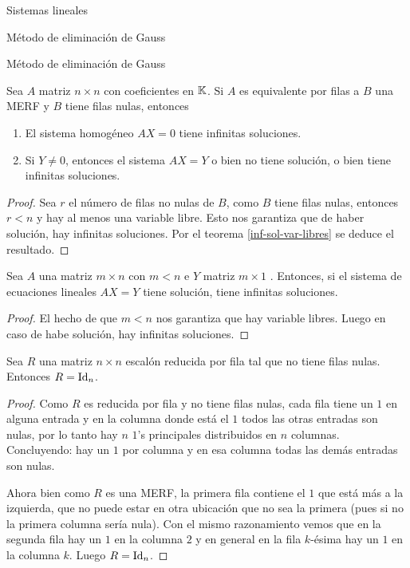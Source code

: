 \begin{chapter}{Sistemas lineales}
\begin{section}{Método de eliminación de Gauss }
\begin{subsection}{Método de eliminación de Gauss}
    \begin{corolario}\label{inf-sol}
        Sea $A$ matriz $n \times n$ con coeficientes en $\mathbb K$. Si $A$ es equivalente por filas a  $B$ una  MERF y $B$ tiene filas nulas, entonces
        \begin{enumerate}
            \item\label{sol-homogeneo-2} El sistema homogéneo $AX=0$ tiene  infinitas soluciones. 
            \item\label{sol-no-homogeneo-2} Si $Y \ne 0$,  entonces el sistema  $AX =Y$ o bien no tiene solución, o bien tiene infinitas soluciones.
        \end{enumerate} 
    \end{corolario}
    \begin{proof} Sea $r$  el número de filas no nulas de $B$, como $B$ tiene filas nulas,  entonces $r<n$ y  hay al menos una variable libre. Esto nos garantiza que de haber solución, hay infinitas soluciones. Por el teorema \ref{inf-sol-var-libres} se deduce el resultado. 
    \end{proof}
    
    \begin{corolario}\label{soluciones-m-menor-n}
        Sea $A$ una matriz $m \times n$ con  $m < n$ e $Y$ matriz $m \times 1$ . Entonces, si el sistema de ecuaciones lineales $AX=Y$ tiene solución, tiene infinitas soluciones.
    \end{corolario}
    \begin{proof}
        El hecho de que $m < n$  nos garantiza que hay variable libres. Luego en caso de habe solución, hay infinitas soluciones. 
    \end{proof}
    
    \begin{lema}\label{lem-mtrx-merf-id}
        Sea $R$ una matriz $n \times n$ escalón reducida por fila tal que no tiene filas nulas. Entonces $R=\operatorname{Id}_n$. 
    \end{lema}
    \begin{proof}
        Como  $R$ es reducida por fila y no tiene filas nulas, cada fila tiene  un $1$ en alguna entrada y en la columna donde está el $1$ todos las otras entradas son nulas, por  lo tanto hay $n$ $1$'s principales distribuidos en $n$ columnas. Concluyendo: hay un $1$ por columna y en esa columna todas las demás entradas son nulas. 
        
        Ahora bien como $R$ es una MERF, la primera fila contiene el $1$ que está más a la izquierda, que no puede estar en otra ubicación que no sea la primera (pues si no la primera columna sería nula). Con el mismo razonamiento vemos que en la segunda fila hay un $1$ en la columna $2$ y en general en la fila $k$-ésima hay un $1$ en la columna $k$. Luego $R=\operatorname{Id}_n$.
    \end{proof}			
    

\end{subsection}
\end{section}
\end{chapter}

